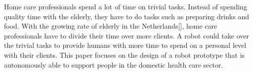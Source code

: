 \documentclass[project_eva.tex]{subfiles}
\begin{document}
Home care professionals spend a lot of time on trivial tasks. Instead of spending quality time with the elderly, they have to do tasks such as preparing drinks and food. With the growing rate of elderly in the Netherlands[\cite{CBS}], home care professionals have to divide their time over more clients. A robot could take over the trivial tasks to provide humans with more time to spend on a personal level with their clients.
This paper focuses on the design of a robot prototype that is autonomously able to support people in the domestic health care sector. 
\end{document}
